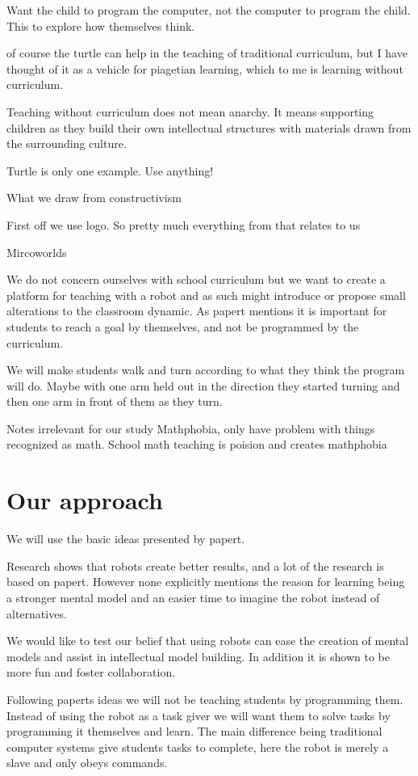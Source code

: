 Want the child to program the computer, not the computer to program the child. This to explore how themselves think.

of course the turtle can help in the teaching of traditional curriculum, but I have thought of it as a vehicle for piagetian learning, which to me is learning without curriculum.

Teaching without curriculum does not mean anarchy. It means supporting children as they build their own intellectual structures with materials drawn from the surrounding culture. 

Turtle is only one example. Use anything!

What we draw from constructivism

First off we use logo. So pretty much everything from that relates to us

Mircoworlds

We do not concern ourselves with school curriculum but we want to create a platform for teaching with a robot and as such might introduce or propose small alterations to the classroom dynamic. As papert mentions it is important for students to reach a goal by themselves, and not be programmed by the curriculum.

We will make students walk and turn according to what they think the program will do. Maybe with one arm held out in the direction they started turning and then one arm in front of them as they turn.

Notes irrelevant for our study 
Mathphobia, only have problem with things recognized as math.
School math teaching is poision and creates mathphobia

\section{Our approach}
We will use the basic ideas presented by papert.

Research shows that robots create better results, and a lot of the research is based on papert. However none explicitly mentions the reason for learning being a stronger mental model and an easier time to imagine the robot instead of alternatives. 

We would like to test our belief that using robots can ease the creation of mental models and assist in intellectual model building. In addition it is shown to be more fun and foster collaboration.

Following paperts ideas we will not be teaching students by programming them. Instead of using the robot as a task giver we will want them to solve tasks by programming it themselves and learn. The main difference being traditional computer systems give students tasks to complete, here the robot is merely a slave and only obeys commands.

